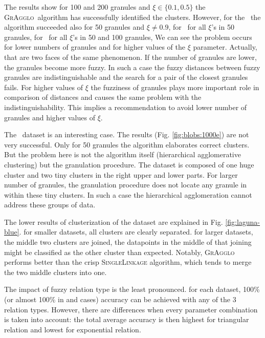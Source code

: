 \documentclass{amcs}
\newcommand{\blobs}{\dataset{blobs}}
\newcommand{\circles}{\dataset{circles}}
\newcommand{\crescents}{\dataset{crescents}}
\newcommand{\laguna}{\dataset{laguna}}
\newcommand{\procedura}[1]{\textsc{#1}}
\newcommand{\SingleLinkage}{\procedura{Si\-ng\-le\-Lin\-ka\-ge}}
\newcommand{\MojAlg}{\procedura{GrAgglo}}
\begin{document}
The results show for 100 and 200 granules and $\xi \in \{0.1, 0.5\}$ the \MojAlg\ algorithm has successfully identified the clusters.
However, for the \circles\ the algorithm succeeded also for  50 granules and $\xi \neq 0.9$, 
for \crescents\ for all $\xi$'s in 50 granules,
for \laguna\ for all $\xi$'s in 50 and 100 granules,
We can see the problem occurs for lower numbers of granules and for higher values of the $\xi$ parameter. 
Actually, that are two faces of the same phenomenon.
If the number of granules are lower, the granules become more fuzzy.
In such a case the fuzzy distances between fuzzy granules are indistinguishable and the search for a pair of the closest granules fails. 
For higher values of $\xi$ the fuzziness of granules plays more important role in comparison of distances and causes the same problem with the indistinguishability.
This implies a recommendation to avoid lower number of granules and higher values of $\xi$.

The \blobs\ dataset is an interesting case.
The results (Fig. \ref{fig:blobs:1000e}) are not very successful. 
Only for 50 granules the algorithm elaborates correct clusters. 
But the problem here is not the algorithm itself (hierarchical agglomerative clustering) but the granulation procedure. 
The dataset is composed of one huge cluster and two tiny clusters in the right upper and lower parts. 
For larger number of granules, the granulation procedure does not locate any granule in within these tiny clusters. 
In such a case the hierarchical agglomeration cannot address these groups of data.


The lower results of clusterization of the \laguna{} dataset are explained in Fig. \ref{fig:laguna-blue}. for smaller datasets, all clusters are clearly separated. for larger datasets, the middle two clusters are joined, the datapoints in the middle of that joining might be classified as the other cluster than expected. Notably, \MojAlg{} performs better than the crisp \SingleLinkage{} algorithm, which tends to merge the two middle clusters into one.



The impact of fuzzy relation type is the least pronounced. for each dataset, 100\% (or almost 100\% in \blobs{} and \laguna{} cases) accuracy can be achieved with any of the 3 relation types. However, there are differences when every parameter combination is taken into account: the total average accuracy is then highest for triangular relation and lowest for exponential relation. 
\end{document}
